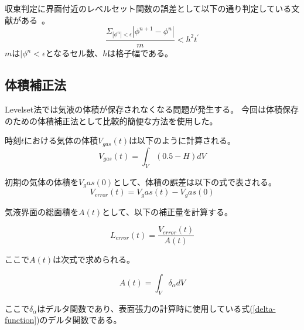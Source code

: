 収束判定に界面付近のレベルセット関数の誤差として以下の通り判定している文献がある~\cite{Shimizu2000}。
\begin{equation}
	\frac{\Sigma_{|\phi^{n}|<\epsilon} |\phi^{n+1}-\phi^{n}|}{m} < h^2 t^{\prime}
\end{equation}
$m$は$|\phi^{n}<\epsilon$となるセル数、$h$は格子幅である。

\subsection{体積補正法}

Levelset法では気液の体積が保存されなくなる問題が発生する。
今回は体積保存のための体積補正法として比較的簡便な方法を使用した。

時刻$t$における気体の体積$V_{gas}(t)$は以下のように計算される。
\begin{equation}
	V_{gas} (t) = \int_{V} (0.5 - H) dV
\end{equation}

初期の気体の体積を$V_gas(0)$として、体積の誤差は以下の式で表される。
\begin{equation}
	V_{error} (t) = V_gas(t) - V_gas(0)
\end{equation}

気液界面の総面積を$A(t)$として、以下の補正量を計算する。

\begin{equation}
	L_{error} (t) = \frac{V_{error}(t)}{A(t)}
\end{equation}

ここで$A(t)$は次式で求められる。

\begin{equation}
	A(t) = \int_{V} \delta_{\alpha} dV
\end{equation}

ここで$\delta_{\alpha}$はデルタ関数であり、表面張力の計算時に使用している式(\ref{delta-function})のデルタ関数である。


